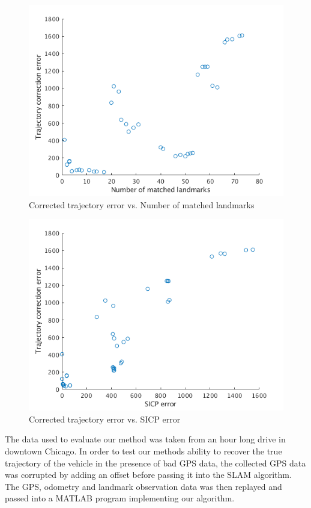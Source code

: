 \documentclass[letterpaper, 10 pt, conference]{ieeeconf}  %
\begin{document}
\begin{figure}[thpb]
  \centering
  \includegraphics[width=\linewidth]{traj_err.png}
  \caption{Corrected trajectory error vs. Number of matched landmarks}
  \label{fig:trajerr}
\end{figure}

\begin{figure}[thpb]
  \centering
  \includegraphics[width=\linewidth]{sicp_traj_err.png}
  \caption{Corrected trajectory error vs. SICP error}
  \label{fig:sicptrajerr}
\end{figure}

The data used to evaluate our method was taken from an hour long drive in downtown Chicago.
In order to test our methods ability to recover the true trajectory of the vehicle in the presence of bad GPS data, the collected GPS data was corrupted by adding an offset before passing it into the SLAM algorithm.
The GPS, odometry and landmark observation data was then replayed and passed into a MATLAB program implementing our algorithm.
\end{document}
